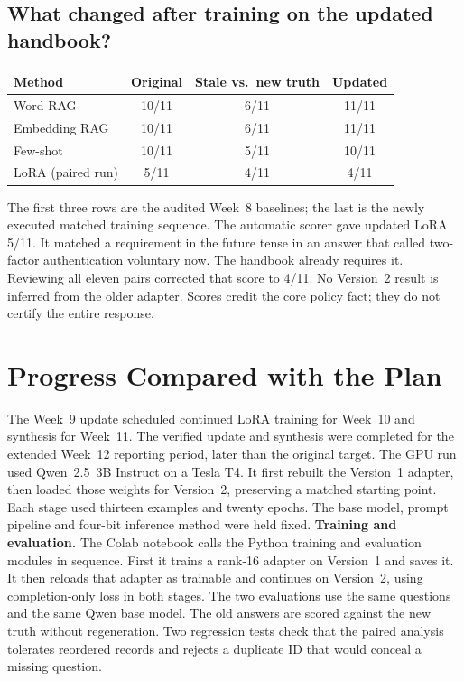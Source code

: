 \documentclass[10pt,letterpaper]{article}
\begin{document}
\subsection{What changed after training on the updated handbook?}
\begin{center}
\begin{tabular}{lccc}\toprule
Method & Original & Stale vs.\ new truth & Updated\\\midrule
Word RAG & 10/11 & 6/11 & 11/11\\
Embedding RAG & 10/11 & 6/11 & 11/11\\
Few-shot & 10/11 & 5/11 & 10/11\\
LoRA (paired run) & 5/11 & 4/11 & 4/11\\\bottomrule
\end{tabular}
\end{center}
The first three rows are the audited Week~8 baselines; the last is the newly executed matched training sequence. The automatic scorer gave updated LoRA 5/11. It matched a requirement in the future tense in an answer that called two-factor authentication voluntary now. The handbook already requires it. Reviewing all eleven pairs corrected that score to 4/11. No Version~2 result is inferred from the older adapter. Scores credit the core policy fact; they do not certify the entire response.
\clearpage
\section{Progress Compared with the Plan}
The Week~9 update scheduled continued LoRA training for Week~10 and synthesis for Week~11. The verified update and synthesis were completed for the extended Week~12 reporting period, later than the original target. The GPU run used Qwen~2.5~3B Instruct on a Tesla T4. It first rebuilt the Version~1 adapter, then loaded those weights for Version~2, preserving a matched starting point. Each stage used thirteen examples and twenty epochs. The base model, prompt pipeline and four-bit inference method were held fixed.
\textbf{Training and evaluation.} The Colab notebook calls the Python training and evaluation modules in sequence. First it trains a rank-16 adapter on Version~1 and saves it. It then reloads that adapter as trainable and continues on Version~2, using completion-only loss in both stages. The two evaluations use the same questions and the same Qwen base model. The old answers are scored against the new truth without regeneration. Two regression tests check that the paired analysis tolerates reordered records and rejects a duplicate ID that would conceal a missing question.
\end{document}
